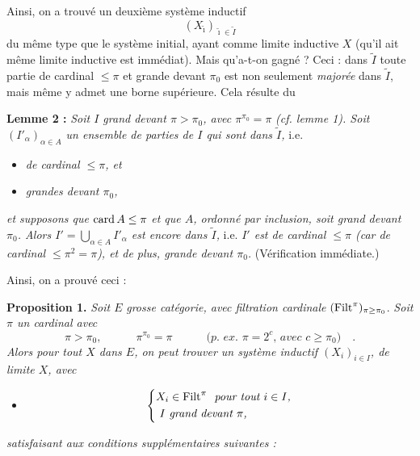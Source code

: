 Ainsi, on a trouvé un deuxième système inductif
\[
(X_{\tilde\imath})_{\tilde\imath\in\tilde I}
\]
du même type que le système initial, ayant comme limite inductive $X$ (qu'il ait même limite inductive est immédiat). Mais qu'a-t-on gagné ? Ceci : dans $\tilde I$ toute partie de cardinal $\le\pi$ et grande devant $\pi_0$ est non seulement \textit{majorée} dans $\tilde I$, mais même y admet une borne supérieure. Cela résulte du %

\textbf{Lemme 2 :} \textit{Soit $I$ grand devant $\pi>\pi_0$, avec $\pi^{\pi_0}=\pi$} \textit{(cf. lemme 1). Soit $(I'_\alpha)_{\alpha\in A}$ un ensemble de parties de $I$ qui sont dans $\tilde I$,} i.e.

\begin{itemize}
\item[a)] \textit{de cardinal $\le\pi$, et}
\item[b)] \textit{grandes devant $\pi_0$,}
\end{itemize}

\textit{et supposons que} $\mathrm{card}\, A\le\pi$ \textit{et que $A$, ordonné par inclusion, soit grand devant $\pi_0$. Alors $I'=\bigcup_{\alpha\in A} I'_\alpha$ est encore dans $\tilde I$,} i.e. \textit{$I'$ est de cardinal $\le\pi$ (car de cardinal $\le\pi^2=\pi$), et de plus, grande devant $\pi_0$.} (Vérification immédiate.)

Ainsi, on a prouvé ceci :

\textbf{Proposition 1.} \textit{Soit $E$} \textit{grosse catégorie, avec filtration cardinale} $(\mathrm{Filt}^\pi)_{\pi\ge\pi_0}$. \textit{Soit $\pi$ un cardinal avec}
\[
\pi>\pi_0, \qquad\quad \pi^{\pi_0}=\pi \qquad\quad \textit{(p. ex. $\pi=2^c$, avec $c\ge\pi_0$)} \quad .
\]
\textit{Alors pour tout $X$ dans $E$, on peut trouver un système inductif $(X_i)_{i\in I}$, de limite $X$, avec}

\begin{itemize}
\item[a)] \[ \left\{ \begin{aligned} & X_i\in\Filt^\pi \ \ \textit{pour tout $i\in I$,} \\ & \ I \ \textit{grand devant $\pi$,} \end{aligned} \right. \]
\end{itemize}

\textit{satisfaisant aux conditions supplémentaires suivantes :}

